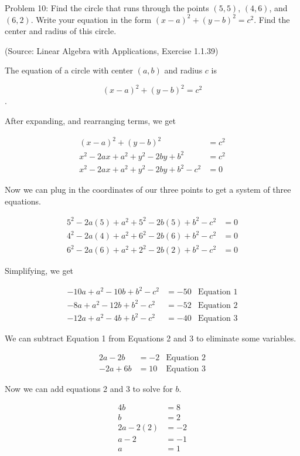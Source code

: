 Problem 10: Find the circle that runs through the points $(5, 5)$, $(4, 6)$, and $(6, 2)$. Write your equation in the form $(x - a)^2 + (y - b)^2 = c^2$. Find the center and radius of this circle.

(Source: Linear Algebra with Applications, Exercise 1.1.39)

The equation of a circle with center $(a, b)$ and radius $c$ is

$$(x - a)^2 + (y - b)^2 = c^2$$.

After expanding, and rearranging terms, we get

\begin{align*}
(x - a)^2 + (y - b)^2 &= c^2 \\
x^2 - 2ax + a^2 + y^2 - 2by + b^2 &= c^2 \\
x^2 - 2ax + a^2 + y^2 - 2by + b^2 - c^2 &= 0
\end{align*}

Now we can plug in the coordinates of our three points to get a system of three equations.

\begin{align*}
5^2 - 2a(5) + a^2 + 5^2 - 2b(5) + b^2 - c^2 &= 0 \\
4^2 - 2a(4) + a^2 + 6^2 - 2b(6) + b^2 - c^2 &= 0 \\
6^2 - 2a(6) + a^2 + 2^2 - 2b(2) + b^2 - c^2 &= 0
\end{align*}

Simplifying, we get

\begin{align*}
-10a + a^2 - 10b + b^2 - c^2 &= -50 & \text{Equation 1} \\
-8a + a^2 - 12b + b^2 - c^2 &= -52 & \text{Equation 2} \\
-12a + a^2 - 4b + b^2 - c^2 &= -40& \text{Equation 3}
\end{align*}

We can subtract Equation 1 from Equations 2 and 3 to eliminate some variables.

\begin{align*}
2a - 2b &= -2 & \text{Equation 2} \\
-2a + 6b &= 10 & \text{Equation 3}
\end{align*}

Now we can add equations 2 and 3 to solve for $b$.

\begin{align*}
4b &= 8 \\
b &= 2 \\
2a - 2(2) &= -2 \\
a - 2 &= -1 \\
a &= 1
\end{align*}

